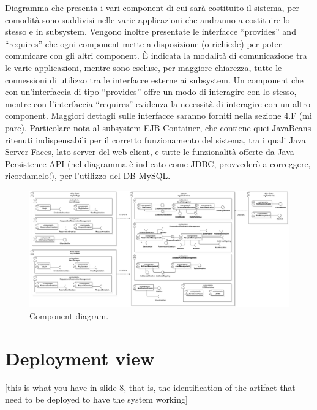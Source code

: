 Diagramma che presenta i vari component di cui sarà costituito il sistema, per comodità sono suddivisi nelle varie applicazioni che andranno a costituire lo stesso e in subsystem.
Vengono inoltre presentate le interfacce “provides” and “requires” che ogni component mette a disposizione (o richiede) per poter comunicare con gli altri component.
È indicata la modalità di comunicazione tra le varie applicazioni, mentre sono escluse, per maggiore chiarezza, tutte le connessioni di utilizzo tra le interfacce esterne ai subsystem.
Un component che con un’interfaccia di tipo “provides” offre un modo di interagire con lo stesso, mentre con l’interfaccia “requires” evidenza la necessità di interagire con un altro component. Maggiori dettagli sulle interfacce saranno forniti nella sezione 4.F (mi pare).
Particolare nota al subsystem EJB Container, che contiene quei JavaBeans ritenuti indispensabili per il corretto funzionamento del sistema, tra i quali Java Server Faces, lato server del web client, e tutte le funzionalità offerte da Java Persistence API (nel diagramma è indicato come JDBC, provvederò a correggere, ricordamelo!), per l’utilizzo del DB MySQL.

\begin{figure}
	\includegraphics[width=\textwidth]{img/ComponentView__ComponentDiagram_1}
	\caption{Component diagram.}
	\label{img:component}
\end{figure}















\clearpage%
\section{Deployment view}\label{sec:deployment}
[this is what you have in slide 8, that is, the identification of the artifact that need to be deployed to have the system working]

